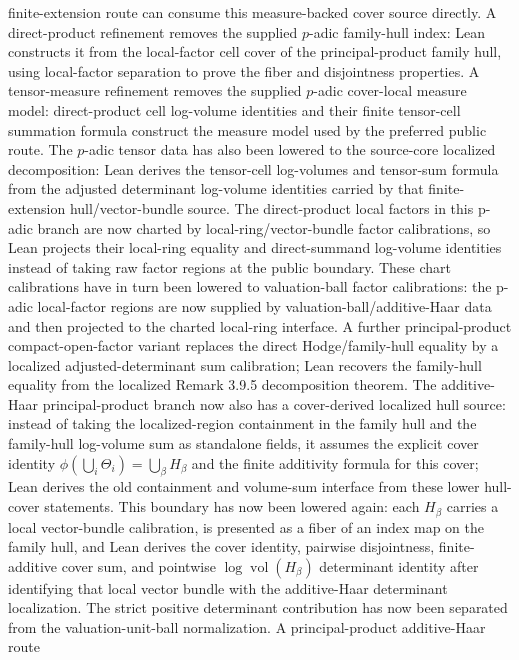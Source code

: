 \documentclass[11pt]{article}
\theoremstyle{plain}
\theoremstyle{definition}
\theoremstyle{remark}
\begin{document}
finite-extension route can consume this measure-backed cover source directly.
A direct-product refinement removes the supplied \(p\)-adic family-hull index:
Lean constructs it from the local-factor cell cover of the principal-product
family hull, using local-factor separation to prove the fiber and disjointness
properties.
A tensor-measure refinement removes the supplied \(p\)-adic cover-local
measure model: direct-product cell log-volume identities and their finite
tensor-cell summation formula construct the measure model used by the
preferred public route.
The \(p\)-adic tensor data has also been lowered to the source-core localized
decomposition: Lean derives the tensor-cell log-volumes and tensor-sum formula
from the adjusted determinant log-volume identities carried by that
finite-extension hull/vector-bundle source.
The direct-product local factors in this p-adic branch are now charted by
local-ring/vector-bundle factor calibrations, so Lean projects their
local-ring equality and direct-summand log-volume identities instead of taking
raw factor regions at the public boundary.
These chart calibrations have in turn been lowered to valuation-ball
factor calibrations: the p-adic local-factor regions are now supplied by
valuation-ball/additive-Haar data and then projected to the charted local-ring
interface.
A further principal-product compact-open-factor variant replaces the direct
Hodge/family-hull equality by a localized adjusted-determinant sum
calibration; Lean recovers the family-hull equality from the localized
Remark 3.9.5 decomposition theorem.
The additive-Haar principal-product branch now also has a cover-derived
localized hull source: instead of taking the localized-region containment in
the family hull and the family-hull log-volume sum as standalone fields, it
assumes the explicit cover identity
\(\phi(\bigcup_i\Theta_i)=\bigcup_\beta H_\beta\) and the finite additivity
formula for this cover; Lean derives the old containment and volume-sum
interface from these lower hull-cover statements.  This boundary has now been
lowered again: each \(H_\beta\) carries a local vector-bundle calibration, is
presented as a fiber of an index map on the family hull, and Lean derives the
cover identity, pairwise disjointness, finite-additive cover sum, and pointwise
\(\log\operatorname{vol}(H_\beta)\) determinant identity after identifying that
local vector bundle with the additive-Haar determinant localization.
The strict positive determinant contribution has now been separated from the
valuation-unit-ball normalization.  A principal-product additive-Haar route
\end{document}
